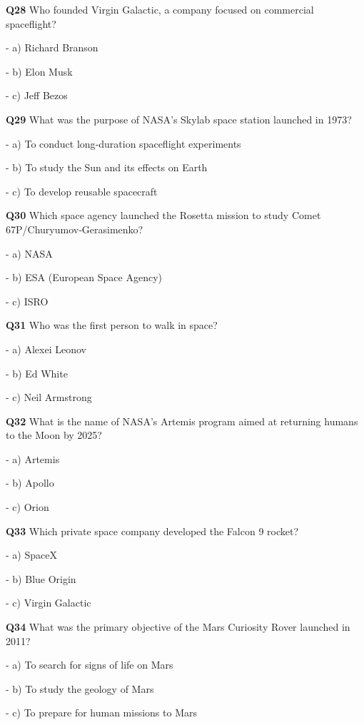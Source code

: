 \textbf{Q28} Who founded Virgin Galactic, a company focused on commercial spaceflight?\par
\quad - a) Richard Branson\par
\quad - b) Elon Musk\par
\quad - c) Jeff Bezos\par

\textbf{Q29} What was the purpose of NASA's Skylab space station launched in 1973?\par
\quad - a) To conduct long‑duration spaceflight experiments\par
\quad - b) To study the Sun and its effects on Earth\par
\quad - c) To develop reusable spacecraft\par

\textbf{Q30} Which space agency launched the Rosetta mission to study Comet 67P/Churyumov‑Gerasimenko?\par
\quad - a) NASA\par
\quad - b) ESA (European Space Agency)\par
\quad - c) ISRO\par

\textbf{Q31} Who was the first person to walk in space?\par
\quad - a) Alexei Leonov\par
\quad - b) Ed White\par
\quad - c) Neil Armstrong\par

\textbf{Q32} What is the name of NASA's Artemis program aimed at returning humans to the Moon by 2025?\par
\quad - a) Artemis\par
\quad - b) Apollo\par
\quad - c) Orion\par

\textbf{Q33} Which private space company developed the Falcon 9 rocket?\par
\quad - a) SpaceX\par
\quad - b) Blue Origin\par
\quad - c) Virgin Galactic\par

\textbf{Q34} What was the primary objective of the Mars Curiosity Rover launched in 2011?\par
\quad - a) To search for signs of life on Mars\par
\quad - b) To study the geology of Mars\par
\quad - c) To prepare for human missions to Mars\par

